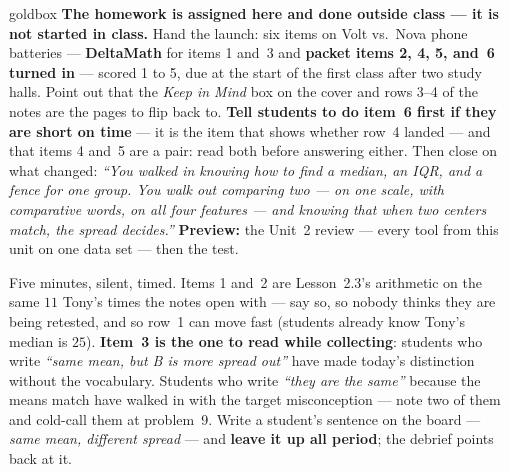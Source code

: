 \documentclass[10pt]{article}
\begin{document}
\boxguard
\begin{skillbox}{goldbox}
\textbf{The homework is assigned here and done outside class --- it is not started in
class.} Hand the launch: six items on Volt vs.\ Nova phone batteries --- \textbf{DeltaMath} for
items 1 and~3 and \textbf{packet items 2, 4, 5, and~6 turned in} --- scored 1 to 5, due at the start of the first class after two study halls. Point out that
the \emph{Keep in Mind} box on the cover and rows 3--4 of the notes are the pages to flip back
to. \textbf{Tell students to do item~6 first if they are short on time} --- it is the item
that shows whether row~4 landed --- and that items 4 and~5 are a pair: read both before
answering either. Then close on what changed: \emph{``You walked in knowing how to find a
median, an IQR, and a fence for one group. You walk out comparing two --- on one scale, with
comparative words, on all four features --- and knowing that when two centers match, the
spread decides.''} \textbf{Preview:} the Unit~2 review --- every tool from this unit on one
data set --- then the test.
\end{skillbox}

\begin{teachernote}[Warm-Up]
Five minutes, silent, timed. Items 1 and~2 are Lesson~2.3's arithmetic on the same $11$ Tony's
times the notes open with --- say so, so nobody thinks they are being retested, and so row~1
can move fast (students already know Tony's median is $25$). \textbf{Item~3 is the one to read
while collecting}: students who write \emph{``same mean, but B is more spread out''} have made
today's distinction without the vocabulary. Students who write \emph{``they are the same''}
because the means match have walked in with the target misconception --- note two of them and
cold-call them at problem~9. Write a student's sentence on the board --- \emph{same mean,
different spread} --- and \textbf{leave it up all period}; the debrief points back at it.
\end{teachernote}
\end{document}
